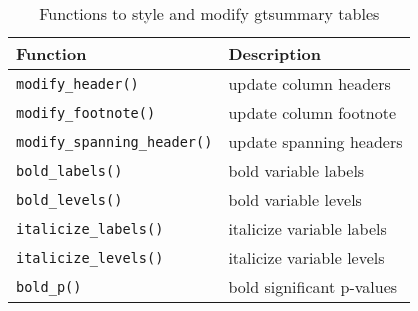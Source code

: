 \captionsetup[table]{labelformat=empty,skip=1pt}
\begin{longtable}{ll}
\caption{\label{tab:} Functions to style and modify gtsummary tables}\\
\toprule
Function & Description \\ 
\midrule
\texttt{modify\_header()} & update column headers \\ 
\texttt{modify\_footnote()} & update column footnote \\ 
\texttt{modify\_spanning\_header()} & update spanning headers \\ 
\texttt{bold\_labels()} & bold variable labels \\ 
\texttt{bold\_levels()} & bold variable levels \\ 
\texttt{italicize\_labels()} & italicize variable labels \\ 
\texttt{italicize\_levels()} & italicize variable levels \\ 
\texttt{bold\_p()} & bold significant p-values \\ 
\bottomrule
\end{longtable}

